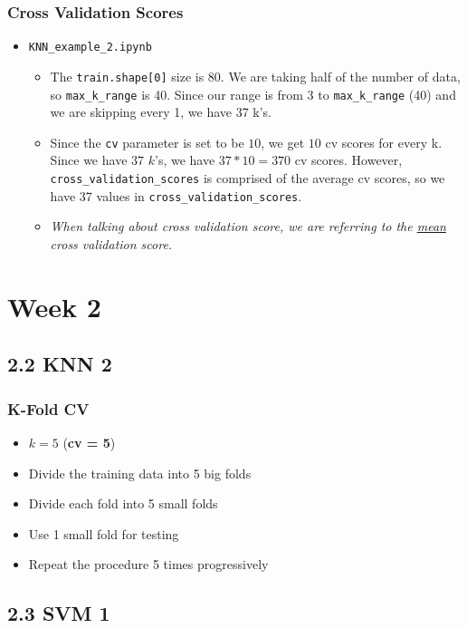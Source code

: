 \documentclass{article}
\begin{document}
\subsubsection*{Cross Validation Scores}
\begin{itemize}
    \item \verb|KNN_example_2.ipynb|
    \begin{itemize}
        \item The \verb|train.shape[0]| size is 80. We are taking half of the number of data, so \verb|max_k_range| is 40. Since our range is from 3 to \verb|max_k_range| (40) and we are skipping every 1, we have 37 k's.
        \item Since the \verb|cv| parameter is set to be $10$, we get $10$ cv scores for every k. Since we have $37$ $k$'s, we have $37 * 10 = 370$ cv scores. However, \verb|cross_validation_scores| is comprised of the average cv scores, so we have 37 values in \verb|cross_validation_scores|.
        \item \emph{When talking about cross validation score, we are referring to the \underline{mean} cross validation score.}
    \end{itemize}
\end{itemize}


\section*{Week 2}

\subsection*{2.2 KNN 2}
\subsubsection*{K-Fold CV}
\begin{itemize}
    \item $k = 5$ (\textbf{cv = 5})
    \item Divide the training data into 5 big folds
    \item Divide each fold into 5 small folds
    \item Use 1 small fold for testing
    \item Repeat the procedure 5 times progressively
\end{itemize}

\subsection*{2.3 SVM 1}
\end{document}
